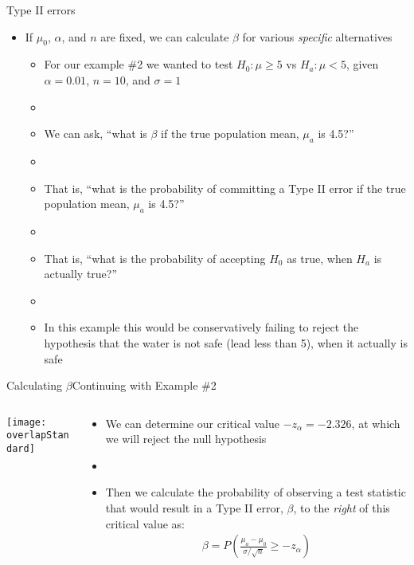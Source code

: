 \documentclass[xcolor=dvipsnames]{beamer}
\begin{document}
\begin{frame}{Type II errors}
	\begin{itemize}
		\item If $\mu_0$, $\alpha$, and $n$ are fixed, we can calculate $\beta$ for various \emph{specific} alternatives
		\begin{itemize}
			\item For our example \#2 we wanted to test $H_0: \mu \geq 5$ vs $H_a: \mu < 5$, given $\alpha = 0.01$, $n = 10$, and $\sigma = 1$
			\item[]
			\item We can ask, ``what is $\beta$ if the true population mean, $\mu_a$ is 4.5?'' 
			\item[]
			\item That is, ``what is the probability of committing a Type II error if the true population mean, $\mu_a$ is 4.5?''
			\item[]
			\item That is, ``what is the probability of accepting $H_0$ as true, when $H_a$ is actually true?''
			\item[]
			\item In this example this would be conservatively failing to reject the hypothesis that the water is not safe (lead less than 5), when it actually is safe
		\end{itemize}
	\end{itemize}
\end{frame}

\begin{frame}{Calculating $\beta$}{Continuing with Example \#2}
\begin{columns}
	\begin{column}{.55 \textwidth}
		\begin{center}
			\texttt{[image: overlapStandard]}
		\end{center}
	\end{column}
		\begin{column}{.5 \textwidth}
		\begin{itemize}
			\item We can determine our critical value $-z_{\alpha}= -2.326$, at which we will reject the null hypothesis
			
			\item[]
			
			\item Then we calculate the probability of observing a test statistic that would result in a Type II error, $\beta$, to the \emph{right} of this critical value as:
			\begin{gather*}
			\beta = P \left(\frac{\mu_a - \mu_0}{\sigma / \sqrt{n}} \geq -z_{\alpha} \right)
			\end{gather*}
		\end{itemize}
	\end{column}
\end{columns}
\end{frame}
\end{document}
